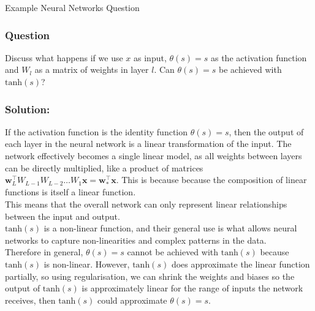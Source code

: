 \begin{examplebox}{Example Neural Networks Question}
\begin{figure}[H]
\end{figure}


\subsubsection*{Question}
Discuss what happens if we use \( x \) as input, \( \theta(s) = s \) as the activation function and \( W_l \) as a matrix of weights in layer \( l \). Can \( \theta(s) = s \) be achieved with \( \text{tanh}(s) \)?

\subsubsection*{Solution:} 
If the activation function is the identity function \( \theta(s) = s \), then the output of each layer in the neural network is a linear transformation of the input. The network effectively becomes a single linear model, as all weights between layers can be directly multiplied, like a product of matrices $\mathbf{w}_{L}^{\top}W_{L-1}W_{L-2}\ldots W_{1}\mathbf{x}=\mathbf{w}_{*}^{\top}\mathbf{x}$. This is because because the composition of linear functions is itself a linear function.\\

This means that the overall network can only represent linear relationships between the input and output.\\

\( \text{tanh}(s) \) is a non-linear function, and their general use is what allows neural networks to capture non-linearities and complex patterns in the data.\\

Therefore in general, \( \theta(s) = s \) cannot be achieved with \( \text{tanh}(s) \) because \( \text{tanh}(s) \) is non-linear. However, \(\text{tanh}(s) \) does approximate the linear function partially, so using regularisation, we can shrink the weights and biases so the output of \( \text{tanh}(s) \) is approximately linear for the range of inputs the network receives, then \( \text{tanh}(s) \) could approximate \( \theta(s) = s \).

\begin{figure}[H]
\centering
{}
\end{figure}
\end{examplebox}
